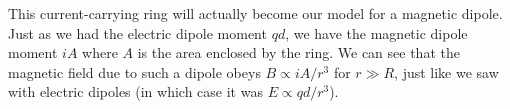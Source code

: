 \documentclass[../p051main.tex]{subfiles}
\begin{document}

This current-carrying ring will actually become our model for a magnetic dipole.
Just as we had the electric dipole moment $qd$, we have the magnetic dipole moment $iA$ where $A$ is the area enclosed by the ring.
We can see that the magnetic field due to such a dipole obeys $B \propto iA / r^3$ for $r \gg R$, just like we saw with electric dipoles (in which case it was $E \propto qd / r^3$).

\end{document}
